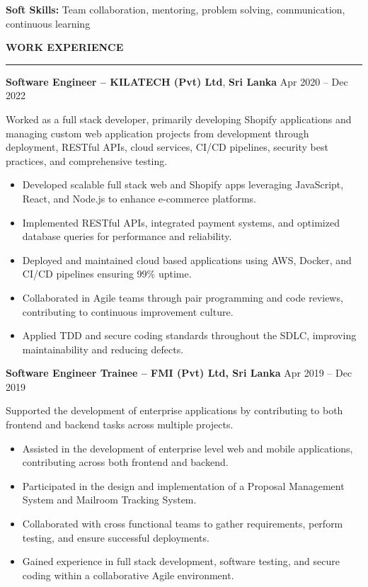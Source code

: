 \documentclass[10pt,letterpaper]{article}
\begin{document}
\textbf{Soft Skills:} Team collaboration, mentoring, problem solving, communication, continuous learning

\vspace{6pt}

\textbf{WORK EXPERIENCE}\\[-8pt]
\noindent\rule{\textwidth}{1pt}

\vspace{-2pt}

\textbf{Software Engineer -- KILATECH (Pvt) Ltd}, \textbf{Sri Lanka} \hfill Apr 2020 -- Dec 2022

\vspace{1pt}

Worked as a full stack developer, primarily developing Shopify applications and managing custom web application projects from development through deployment, RESTful APIs, cloud services, CI/CD pipelines, security best practices, and comprehensive testing.

\begin{itemize}
\item Developed scalable full stack web and Shopify apps leveraging JavaScript, React, and Node.js to enhance e-commerce platforms.
\item Implemented RESTful APIs, integrated payment systems, and optimized database queries for performance and reliability.
\item Deployed and maintained cloud based applications using AWS, Docker, and CI/CD pipelines ensuring 99\% uptime.
\item Collaborated in Agile teams through pair programming and code reviews, contributing to continuous improvement culture.
\item Applied TDD and secure coding standards throughout the SDLC, improving maintainability and reducing defects.
\end{itemize}

\textbf{Software Engineer Trainee -- FMI (Pvt) Ltd, Sri Lanka} \hfill Apr 2019 -- Dec 2019

\vspace{1pt}

Supported the development of enterprise applications by contributing to both frontend and backend tasks across multiple projects.

\begin{itemize}
\item Assisted in the development of enterprise level web and mobile applications, contributing across both frontend and backend.
\item Participated in the design and implementation of a Proposal Management System and Mailroom Tracking System.
\item Collaborated with cross functional teams to gather requirements, perform testing, and ensure successful deployments.
\item Gained experience in full stack development, software testing, and secure coding within a collaborative Agile environment.
\end{itemize}
\end{document}
